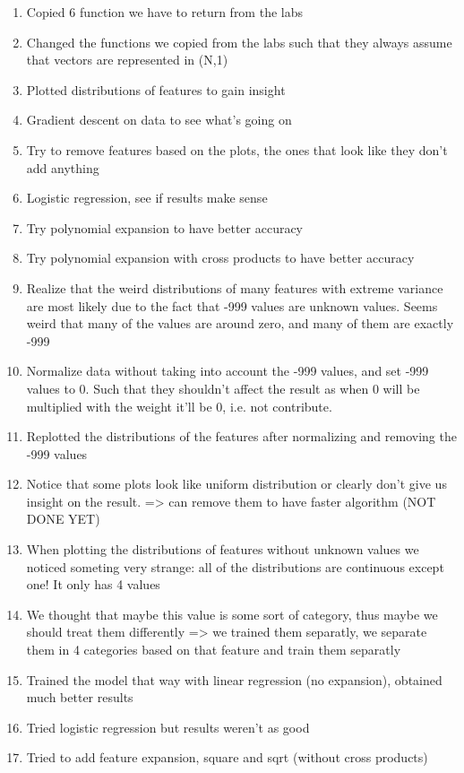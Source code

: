 \documentclass[10pt,conference,compsocconf]{IEEEtran}
\begin{document}
\begin{enumerate}
	\item{Copied 6 function we have to return from the labs}
	\item{Changed the functions we copied from the labs such that they always assume that vectors are represented in (N,1)}
	\item{Plotted distributions of features to gain insight}
	\item{Gradient descent on data to see what's going on}
	\item{Try to remove features based on the plots, the ones that look like they don't add anything}
	\item{Logistic regression, see if results make sense}
	\item{Try polynomial expansion to have better accuracy}
	\item{Try polynomial expansion with cross products to have better accuracy}
	\item{Realize that the weird distributions of many features with extreme variance are most likely due to the fact that -999 values are unknown values. Seems weird that many of the values are around zero, and many of them are exactly -999}
	\item{Normalize data without taking into account the -999 values, and set -999 values to 0. Such that they shouldn't affect the result as when 0 will be multiplied with the weight it'll be 0, i.e. not contribute.}
	\item{Replotted the distributions of the features after normalizing and removing the -999 values}
	\item{Notice that some plots look like uniform distribution or clearly don't give us insight on the result. => can remove them to have faster algorithm (NOT DONE YET)}
	\item{When plotting the distributions of features without unknown values we noticed someting very strange: all of the distributions are continuous except one! It only has 4 values}
	\item{We thought that maybe this value is some sort of category, thus maybe we should treat them differently => we trained them separatly, we separate them in 4 categories based on that feature and train them separatly}
	\item{Trained the model that way with linear regression (no expansion), obtained much better results}
	\item{Tried logistic regression but results weren't as good}
	\item{Tried to add feature expansion, square and sqrt (without cross products)}
\end{enumerate}
\end{document}
